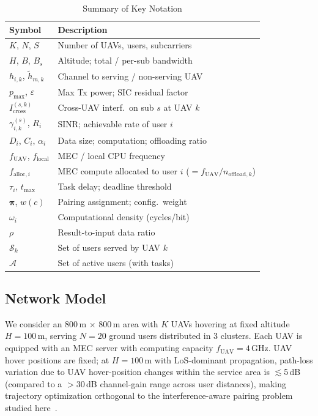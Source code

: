 \documentclass[journal]{IEEEtran}
\begin{document}
\begin{table}[t]
\centering
\caption{Summary of Key Notation}
\label{tab:notation}
\footnotesize
\begin{tabular}{lp{5.5cm}}
\toprule
\textbf{Symbol} & \textbf{Description} \\
\midrule
$K$, $N$, $S$ & Number of UAVs, users, subcarriers \\
$H$, $B$, $B_s$ & Altitude; total / per-sub bandwidth \\
$h_{i,k}$, $\tilde{h}_{m,k}$ & Channel to serving / non-serving UAV \\
$p_{\max}$, $\varepsilon$ & Max Tx power; SIC residual factor \\
$I_{\text{cross}}^{(s,k)}$ & Cross-UAV interf.\ on sub $s$ at UAV $k$ \\
$\gamma_{i,k}^{(s)}$, $R_i$ & SINR; achievable rate of user $i$ \\
$D_i$, $C_i$, $\alpha_i$ & Data size; computation; offloading ratio \\
$f_{\text{UAV}}$, $f_{\text{local}}$ & MEC / local CPU frequency \\
$f_{\text{alloc},i}$ & MEC compute allocated to user $i$ ($= f_{\text{UAV}} / n_{\text{offload},k}$) \\
$\tau_i$, $t_{\max}$ & Task delay; deadline threshold \\
$\boldsymbol{\pi}$, $w(c)$ & Pairing assignment; config.\ weight \\
$\omega_i$ & Computational density (cycles/bit) \\
$\rho$ & Result-to-input data ratio \\
$\mathcal{S}_k$ & Set of users served by UAV $k$ \\
$\mathcal{A}$ & Set of active users (with tasks) \\
\bottomrule
\end{tabular}
\end{table}

\subsection{Network Model}

We consider an 800\,m $\times$ 800\,m area with $K$ UAVs hovering at fixed altitude $H = 100$\,m, serving $N = 20$ ground users distributed in 3 clusters.
Each UAV is equipped with an MEC server with computing capacity $f_{\text{UAV}} = 4$\,GHz.
UAV hover positions are fixed; at $H=100$\,m with LoS-dominant propagation, path-loss variation due to UAV hover-position changes within the service area is $\lesssim$5\,dB (compared to a $>$30\,dB channel-gain range across user distances), making trajectory optimization orthogonal to the interference-aware pairing problem studied here~\cite{wu2018joint}.
\end{document}
